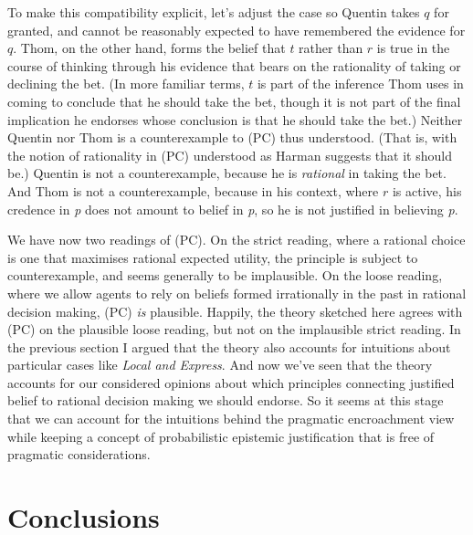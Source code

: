 \documentclass[
  11pt,
  letterpaper,
  DIV=11,
  numbers=noendperiod,
  oneside]{scrartcl}
\begin{document}
To make this compatibility explicit, let's adjust the case so Quentin
takes \(q\) for granted, and cannot be reasonably expected to have
remembered the evidence for \(q\). Thom, on the other hand, forms the
belief that \(t\) rather than \(r\) is true in the course of thinking
through his evidence that bears on the rationality of taking or
declining the bet. (In more familiar terms, \(t\) is part of the
inference Thom uses in coming to conclude that he should take the bet,
though it is not part of the final implication he endorses whose
conclusion is that he should take the bet.) Neither Quentin nor Thom is
a counterexample to (PC) thus understood. (That is, with the notion of
rationality in (PC) understood as Harman suggests that it should be.)
Quentin is not a counterexample, because he is \emph{rational} in taking
the bet. And Thom is not a counterexample, because in his context, where
\(r\) is active, his credence in \emph{p} does not amount to belief in
\emph{p}, so he is not justified in believing \emph{p}.

We have now two readings of (PC). On the strict reading, where a
rational choice is one that maximises rational expected utility, the
principle is subject to counterexample, and seems generally to be
implausible. On the loose reading, where we allow agents to rely on
beliefs formed irrationally in the past in rational decision making,
(PC) \emph{is} plausible. Happily, the theory sketched here agrees with
(PC) on the plausible loose reading, but not on the implausible strict
reading. In the previous section I argued that the theory also accounts
for intuitions about particular cases like \emph{Local and Express}. And
now we've seen that the theory accounts for our considered opinions
about which principles connecting justified belief to rational decision
making we should endorse. So it seems at this stage that we can account
for the intuitions behind the pragmatic encroachment view while keeping
a concept of probabilistic epistemic justification that is free of
pragmatic considerations.

\section{Conclusions}\label{conclusions}
\end{document}

